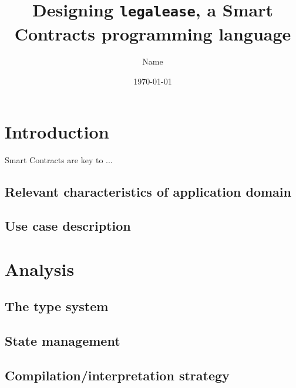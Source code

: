 \documentclass{uva-inf-article}
\title{Designing \texttt{legalease}, a Smart Contracts programming language}
\author{Name}
\date{\today}
\begin{document}
\maketitle




\section{Introduction}
Smart Contracts \cite{relevant-citation-1} are key to ...

\subsection{Relevant characteristics of application domain}

\subsection{Use case description}


\section{Analysis}
\subsection{The type system}
\subsection{State management}
\subsection{Compilation/interpretation strategy}
\end{document}
